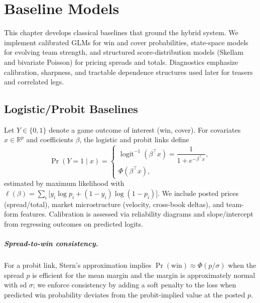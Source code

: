 \chapter{Baseline Models}
\label{chap:methods}

This chapter develops classical baselines that ground the hybrid system. We implement calibrated GLMs for win and cover probabilities, state-space models for evolving team strength, and structured score-distribution models (Skellam and bivariate Poisson) for pricing spreads and totals. Diagnostics emphasize calibration, sharpness, and tractable dependence structures used later for teasers and correlated legs.

\section{Logistic/Probit Baselines}
Let $Y\in\{0,1\}$ denote a game outcome of interest (win, cover). For covariates $x\in\mathbb{R}^p$ and coefficients $\beta$, the logistic and probit links define
\begin{equation*}
\Pr(Y=1\mid x)=\begin{cases}
 \operatorname{logit}^{-1}(\beta^\top x)=\dfrac{1}{1+e^{-\beta^\top x}},\\[3pt]
 \Phi(\beta^\top x),
\end{cases}
\end{equation*}
estimated by maximum likelihood with $\ell(\beta)=\sum_i \big[y_i\log p_i+(1-y_i)\log(1-p_i)\big]$. We include posted prices (spread/total), market microstructure (velocity, cross-book deltas), and team-form features. Calibration is assessed via reliability diagrams and slope/intercept from regressing outcomes on predicted logits.

\paragraph{Spread-to-win consistency.} For a probit link, Stern's approximation implies $\Pr(\text{win})\approx \Phi(p/\sigma)$ when the spread $p$ is efficient for the mean margin and the margin is approximately normal with sd $\sigma$; we enforce consistency by adding a soft penalty to the loss when predicted win probability deviates from the probit-implied value at the posted $p$.

